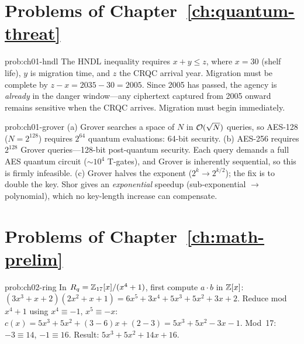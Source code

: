 

\section*{Problems of Chapter~\ref{ch:quantum-threat}}

\begin{sol}{prob:ch01-hndl}
The HNDL inequality requires $x + y \leq z$, where $x = 30$ (shelf life), $y$ is migration time, and $z$ the CRQC arrival year.  Migration must be complete by $z - x = 2035 - 30 = 2005$.  Since 2005 has passed, the agency is \emph{already} in the danger window---any ciphertext captured from 2005 onward remains sensitive when the CRQC arrives.  Migration must begin immediately.
\end{sol}

\begin{sol}{prob:ch01-grover}
(a) Grover searches a space of $N$ in $\mathcal{O}(\sqrt{N})$ queries, so AES-128 ($N=2^{128}$) requires $2^{64}$ quantum evaluations: 64-bit security.
(b) AES-256 requires $2^{128}$ Grover queries---128-bit post-quantum security.  Each query demands a full AES quantum circuit ($\sim\!10^4$ T-gates), and Grover is inherently sequential, so this is firmly infeasible.
(c) Grover halves the exponent ($2^k \to 2^{k/2}$); the fix is to double the key.  Shor gives an \emph{exponential} speedup (sub-exponential $\to$ polynomial), which no key-length increase can compensate.
\end{sol}

\section*{Problems of Chapter~\ref{ch:math-prelim}}

\begin{sol}{prob:ch02-ring}
In $R_q = \mathbb{Z}_{17}[x]/(x^4+1)$, first compute $a\cdot b$ in $\mathbb{Z}[x]$:
$(3x^3+x+2)(2x^2+x+1) = 6x^5+3x^4+5x^3+5x^2+3x+2$.
Reduce mod $x^4+1$ using $x^4\equiv -1$, $x^5\equiv -x$:
$c(x) = 5x^3+5x^2+(3-6)x+(2-3) = 5x^3+5x^2-3x-1$.
Mod~17: $-3\equiv 14$, $-1\equiv 16$.  Result: $5x^3+5x^2+14x+16$.
\end{sol}

